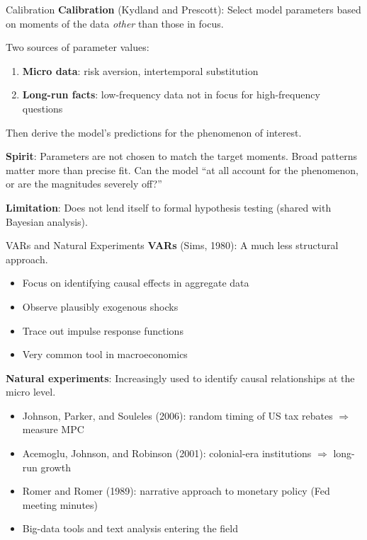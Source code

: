 \documentclass[blue]{beamer}
\begin{document}
\begin{frame}{Calibration}
	\textbf{Calibration} (Kydland and Prescott): Select model parameters based on moments of the data \emph{other} than those in focus.
	

	Two sources of parameter values:
	\vspace{-6pt}
	\begin{enumerate}
		\item \textbf{Micro data}: risk aversion, intertemporal substitution
		\item \textbf{Long-run facts}: low-frequency data not in focus for high-frequency questions
	\end{enumerate}
	
	Then derive the model's predictions for the phenomenon of interest.

	\textbf{Spirit}: Parameters are not chosen to match the target moments. Broad patterns matter more than precise fit. Can the model ``at all account for the phenomenon, or are the magnitudes severely off?''
	
	\textbf{Limitation}: Does not lend itself to formal hypothesis testing (shared with Bayesian analysis).
\end{frame}

\begin{frame}{VARs and Natural Experiments}
	\textbf{VARs} (Sims, 1980): A much less structural approach.
		\vspace{-6pt}
	\begin{itemize}
		\item Focus on identifying causal effects in aggregate data
		\item Observe plausibly exogenous shocks 
		\item Trace out impulse response functions
		\item Very common tool in macroeconomics
	\end{itemize}
	
	\textbf{Natural experiments}: Increasingly used to identify causal relationships at the micro level.
		\vspace{-6pt}
	\begin{itemize}
		\item Johnson, Parker, and Souleles (2006): random timing of US tax rebates $\Rightarrow$ measure MPC
		\item Acemoglu, Johnson, and Robinson (2001): colonial-era institutions $\Rightarrow$ long-run growth
		\item Romer and Romer (1989): narrative approach to monetary policy (Fed meeting minutes)
		\item Big-data tools and text analysis entering the field
	\end{itemize}
\end{frame}
\end{document}
